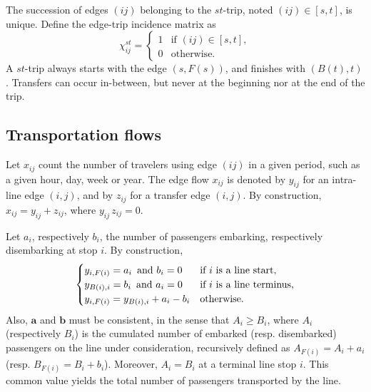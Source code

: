 \documentclass{bmcart}
\begin{document}
The succession of edges $(ij)$ belonging to the $st$-trip, noted $(ij)\in [s,t]$, is unique. Define the edge-trip incidence matrix as
\begin{equation}
\label{edgetrip}
\chi_{ij}^{st} = \begin{cases}
  1    & \text{if $(ij)\in [s,t]$}, \\
  0    & \text{otherwise}.
\end{cases}
\end{equation}
A $st$-trip always starts with the edge $(s,F(s))$, and finishes with $(B(t),t)$. Transfers can occur in-between, but never at the beginning nor at the end of the trip. 

\vspace*{0.1cm}

\subsection{Transportation flows}
\label{Transportation flows}
Let  $x_{ij}$ count the number of travelers using edge $(ij)$ in a given period, such as a given hour, day, week or  year.  The edge flow $x_{ij}$ is denoted by $y_{ij}$ for an intra-line edge $(i,j)$, and 
by $z_{ij}$ for a transfer edge $(i,j)$. By construction, $x_{ij}=y_{ij}+z_{ij}$, where $y_{ij}\,  z_{ij}=0$. 

\vspace*{0.1cm}


Let $a_i$, respectively $b_i$, the number of passengers embarking, respectively disembarking at stop $i$. By construction, 
\begin{equation}
\label{bilan1ligne}
\begin{cases}
 y_{i,F(i)}=a_i \text{\,  and } b_i=0   & \text{if $i$ is a line start}, \\
y_{B(i),i}=b_i \text{\,  and } a_i=0   & \text{if $i$ is a line terminus}, \\
 y_{i,F(i)}=y_{B(i),i}+a_i-b_i     & \text{otherwise}.
\end{cases}
\end{equation}
Also, $\mathbf{a}$ and $\mathbf{b}$ must be consistent, in the sense that $A_i\ge B_i$, where $A_i$ (respectively $B_i$) is the cumulated number of embarked 
(resp. disembarked) passengers on the line under consideration, recursively defined as $A_{F(i)}=A_i+a_i$ (resp. $B_{F(i)}=B_i+b_i$). Moreover,  $A_i=B_i$ at a terminal line stop $i$. This common value yields  the total number of passengers transported by the line. 
\end{document}
